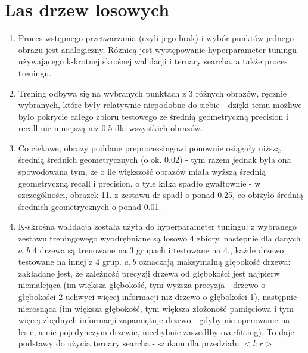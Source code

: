 \documentclass[12pt]{article}
\begin{document}
\section{Las drzew losowych}
\begin{enumerate}
	\item Proces wstępnego przetwarzania (czyli jego brak) i wybór punktów jednego obrazu jest analogiczny. Różnicą jest występowanie hyperparameter tuningu używającego k-krotnej skrośnej walidacji i ternary searcha, a także proces treningu.
	\item Trening odbywa się na wybranych punktach z 3 różnych obrazów, ręcznie wybranych, które były relatywnie niepodobne do siebie - dzięki temu możliwe było pokrycie całego zbioru testowego ze średnią geometryczną precision i recall nie mniejszą niż 0.5 dla wszystkich obrazów.
	\item Co ciekawe, obrazy poddane preprocessingowi ponownie osiągały niższą średnią średnich geometrycznych (o ok. 0.02) - tym razem jednak była ona spowodowana tym, że o ile większość obrazów miała wyższą średnią geometryczną recall i precision, o tyle kilka spadło gwałtownie - w szczególności, obrazek 11. z zestawu dr spadł o ponad 0.25, co obiżyło średnią średnich geometrycznych o ponad 0.01.
	\item K-skrośna walidacja została użyta do hyperparameter tuningu: z wybranego zestawu treningowego wyodrębniane są losowo 4 zbiory, następnie dla danych \(a, b\) 4 drzewa są trenowane na 3 grupach i testowane na 4., każde drzewo testowane na innej z 4 grup. \(a, b\) oznaczają maksymalną głębokość drzewa: zakładane jest, że zależność precyzji drzewa od głębokości jest najpierw niemalejąca (im większa głębokość, tym wyższa precyzja - drzewo o głębokości 2 uchwyci więcej informacji niż drzewo o głębokości 1), następnie nierosnąca (im większa głębokość, tym większa złożoność pamięciowa i tym więcej zbędnych informacji zapamiętuje drzewo - gdyby nie operowanie na lesie, a nie pojedynczym drzewie, niechybnie zaszedłby overfitting). To daje podstawy do użycia ternary searcha - szukam dla przedziału \(<l;r>\)
\end{enumerate}
\end{document}
